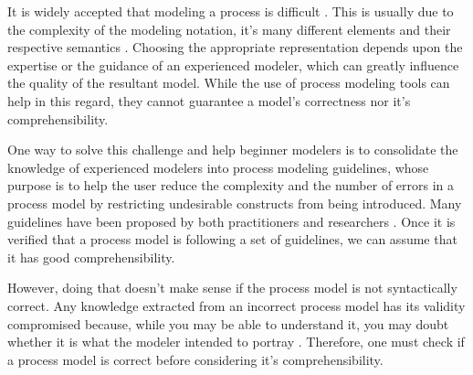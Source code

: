\documentclass{llncs}
\begin{document}
It is widely accepted that modeling a process is difficult \cite{7PMG}. This is usually due to the complexity of the modeling notation, it's many different elements and their respective semantics \cite{What we can learn from Quality Issues of BPMN Models from Industry}. Choosing the appropriate representation depends upon the expertise or the guidance of an experienced modeler, which can greatly influence the quality of the resultant model. While the use of process modeling tools can help in this regard, they cannot guarantee a model's correctness nor it's comprehensibility.



One way to solve this challenge and help beginner modelers is to consolidate the knowledge of experienced modelers into process modeling guidelines, whose purpose is to help the user reduce the complexity and the number of errors in a process model by restricting undesirable constructs from being introduced. Many guidelines have been proposed by both practitioners \cite{Silver2009} \cite{White2008} \cite{Allweyer2010} and researchers \cite{Becker2000} \cite{Mendling2007} \cite{Vanderfeesten2008} \cite{Correia2012}. Once it is verified that a process model is following a set of guidelines, we can assume that it has good comprehensibility.


However, %
doing that doesn't make sense if the process model is not syntactically correct. Any knowledge extracted from an incorrect process model has its validity compromised because, while you may be able to understand it, you may doubt whether it is what the modeler intended to portray \cite{Reijers2015}. Therefore, one must check if a process model is correct before considering it's comprehensibility.
\end{document}

